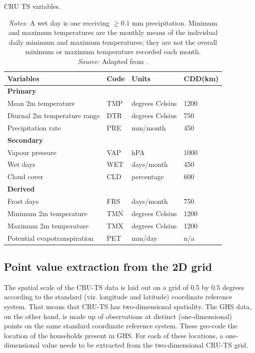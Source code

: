 \documentclass[a4paper,12pt]{article}
\theoremstyle{plain}
\theoremstyle{definition}
\theoremstyle{definition}
\theoremstyle{definition}
\theoremstyle{definition}
\begin{document}
\begin{table}[t!]
    \singlespacing
    \centering
    \caption{CRU TS variables.}
    \begin{tabular}{|p{6cm}|p{1cm}|p{3cm}|p{2cm}| }
    \hline
    \raggedright\textbf{Variables} & \textbf{Code} & \textbf{Units} & \textbf{CDD(km)} \\
    \hline    
    \textbf{Primary} & \ \ & \ \ & \ \ \\
    \quad Mean 2m temperature & TMP & degrees Celsius & 1200\\
    \quad Diurnal 2m temperature range & DTR & degrees Celsius & 750 \\
    \quad Precipitation rate & PRE & mm/month & 450 \\
    \textbf{Secondary} & \ \ & \ \ & \ \ \\
    \quad Vapour pressure & VAP & hPA & 1000 \\
    \quad Wet days & WET & days/month & 450 \\
    \quad Cloud cover & CLD & percentage & 600 \\
    \textbf{Derived} & \ \ & \ \ & \ \ \\
    \quad Frost days &FRS& days/month & 750 \\
    \quad Minimum 2m temperature &TMN& degrees Celsius & 1200 \\
    \quad Maximum 2m temperature &TMX& degrees Celsius & 1200 \\
    \quad Potential evapotranspiration &PET& mm/day & n/a \\
    \hline
    \end{tabular}
    \caption*{\footnotesize{\textit{Notes:} A wet day is one receiving $\geq 0.1$ mm precipitation. Minimum and maximum temperatures are the monthly means of the individual daily minimum and maximum temperatures; they are not the overall minimum or maximum temperature recorded each month.\\ \textit{Source:} Adapted from \citet{harris2020}.}}
    \label{tab:cruvars}
\end{table}

\subsection{Point value extraction from the 2D grid}
\label{sub:combining}

The spatial scale of the CRU-TS data is laid out on a grid of 0.5 by 0.5 degrees according to the standard (viz. longitude and latitude) coordinate reference system. That means that CRU-TS has two-dimensional spatiality. The GHS data, on the other hand, is made up of observations at distinct (one-dimensional) points on the same standard coordinate reference system. These geo-code the location of the households present in GHS. For each of these locations, a one-dimensional value needs to be extracted from the two-dimensional CRU-TS grid.
\end{document}
